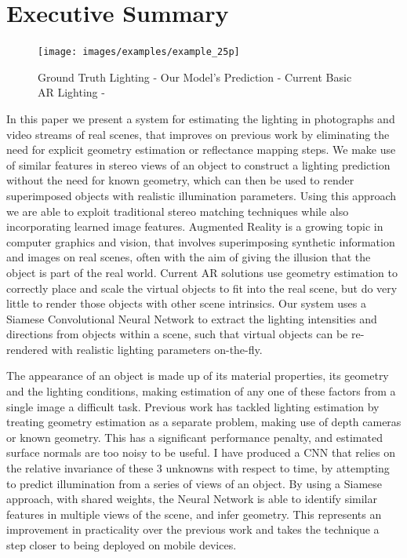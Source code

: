 \documentclass[ %
                    author={Gavin Parker},
                supervisor={Dr. Neill Campbell},
                    degree={MEng},
                     title={Deep Siamese Networks for Illumination Estimation from Stereo Images},
                  subtitle={},
                      type={research},
                      year={2018} ]{dissertation}
\begin{document}
\chapter*{Executive Summary}
\begin{figure}[H]
\centering
\texttt{[image: images/examples/example\_25p]}\\

\caption{Ground Truth Lighting - Our Model's Prediction - Current Basic AR Lighting - }
\label{example_1}
\end{figure}
\noindent
In this paper we present a system for estimating the lighting in photographs and video streams of real scenes, that improves on previous work by eliminating the need for explicit geometry estimation or reflectance mapping steps. We make use of similar features in stereo views of an object to construct a lighting prediction without the need for known geometry, which can then be used to render superimposed objects with realistic illumination parameters. Using this approach we are able to exploit traditional stereo matching techniques while also incorporating learned image features.
\newline
Augmented Reality is a growing topic in computer graphics and vision, that involves superimposing synthetic information and images on real scenes, often with the aim of giving the illusion that the object is part of the real world. Current AR solutions use geometry estimation to correctly place and scale the virtual objects to fit into the real scene, but do very little to render those objects with other scene intrinsics. Our system uses a Siamese Convolutional Neural Network to extract the lighting intensities and directions from objects within a scene, such that virtual objects can be re-rendered with realistic lighting parameters on-the-fly.

The appearance of an object is made up of its material properties, its geometry and the lighting conditions, making estimation of any one of these factors from a single image a difficult task. Previous work has tackled lighting estimation by treating geometry estimation as a separate problem, making use of depth cameras or known geometry. This has a significant performance penalty, and estimated surface normals are too noisy to be useful. I have produced a CNN that relies on the relative invariance of these 3 unknowns with respect to time, by attempting to predict illumination from a series of views of an object. By using a Siamese approach, with shared weights, the Neural Network is able to identify similar features  in multiple views of the scene, and infer geometry. This represents an improvement in practicality over the previous work and takes the technique a step closer to being deployed on mobile devices.
\end{document}
